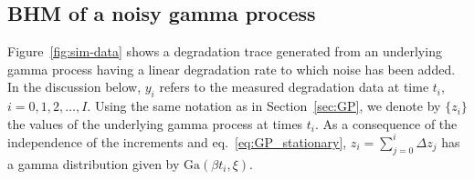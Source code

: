 \documentclass{article}
\begin{document}
\subsection{BHM of a noisy gamma process} \label{subsec:BHM_nGP}

Figure~\ref{fig:sim-data} shows a degradation trace generated from an underlying gamma process having a linear degradation rate to which noise has been added. In the discussion below, $y_i$ refers to the measured degradation data at time $t_i$, $i = 0, 1, 2, \ldots, I$. Using the same notation as in Section~\ref{sec:GP}, we denote by $\{ z_i \}$ the values of the underlying gamma process at times $t_i$. As a consequence of the independence of the increments and eq.~\ref{eq:GP_stationary}, $z_i = \sum_{j = 0}^i \Delta z_j$ has a gamma distribution given by $\mbox{Ga}(\beta t_i, \xi)$. 
\end{document}
